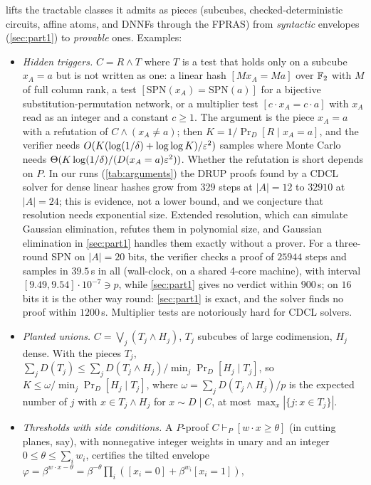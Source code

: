  lifts the tractable classes it admits as pieces (subcubes,
checked-deterministic circuits, affine atoms, and DNNFs through the FPRAS) from
\emph{syntactic} envelopes (\cref{sec:part1}) to \emph{provable} ones. Examples:
\begin{itemize}
\item \emph{Hidden triggers.} $C=R\wedge T$ where $T$ is a test that holds only
on a subcube $x_A=a$ but is not written as one: a linear hash $[Mx_A=Ma]$ over
$\mathbb{F}_2$ with $M$ of full column rank, a test $[\mathrm{SPN}(x_A)=\mathrm{SPN}(a)]$ for
a bijective substitution-permutation network, or a multiplier test $[c\cdot x_A=c\cdot a]$ with $x_A$ read as an integer and a constant
$c\ge1$. The argument is the piece $x_A=a$ with a refutation of $C\wedge(x_A\ne a)$;
then $K=1/\Pr_D[R\mid x_A=a]$, and the verifier needs
$O(K(\log(1/\delta)+\log\log K)/\varepsilon^2)$ samples where Monte Carlo needs
$\Theta(K\log(1/\delta)/(D(x_A=a)\varepsilon^2))$. Whether the refutation is short depends on
$P$. In our runs (\cref{tab:arguments}) the DRUP proofs found by a CDCL solver for
dense linear hashes grow from $329$ steps at $|A|=12$ to $32910$ at $|A|=24$; this is
evidence, not a lower bound, and we conjecture that resolution needs exponential size.
Extended resolution, which can simulate Gaussian elimination, refutes them in
polynomial size, and Gaussian elimination in \cref{sec:part1} handles them exactly
without a prover. For a three-round SPN on $|A|=20$ bits, the verifier checks a proof of
$25944$ steps and samples in $39.5$\,s in all (wall-clock, on a shared 4-core machine),
with interval $[9.49,9.54]\cdot10^{-7}\ni p$, while
\cref{sec:part1} gives no verdict within $900$\,s; on $16$ bits it is the other way
round: \cref{sec:part1} is exact, and the solver finds no proof within $1200$\,s.
Multiplier tests are notoriously hard for CDCL solvers.
\item \emph{Planted unions.} $C=\bigvee_j(T_j\wedge H_j)$, $T_j$ subcubes of large
codimension, $H_j$ dense. With the pieces $T_j$,
$\sum_jD(T_j)\le\sum_jD(T_j\wedge H_j)/\min_j\Pr_D[H_j\mid T_j]$, so
$K\le\omega/\min_j\Pr_D[H_j\mid T_j]$, where $\omega=\sum_jD(T_j\wedge H_j)/p$ is the
expected number of $j$ with $x\in T_j\wedge H_j$ for $x\sim D\mid C$, at most
$\max_x|\{j:x\in T_j\}|$.
\item \emph{Thresholds with side conditions.} A $P$-proof $C\vdash_P[w\cdot
x\ge\theta]$ (in cutting planes, say), with nonnegative integer weights in unary
and an integer $0\le\theta\le\sum_iw_i$, certifies the tilted envelope
$\varphi=\beta^{w\cdot x-\theta}=\beta^{-\theta}\prod_i([x_i=0]+\beta^{w_i}[x_i=1])$,

\end{itemize}
